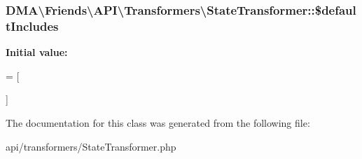 \subsubsection[{\$default\+Includes}]{\setlength{\rightskip}{0pt plus 5cm}D\+M\+A\textbackslash{}\+Friends\textbackslash{}\+A\+P\+I\textbackslash{}\+Transformers\textbackslash{}\+State\+Transformer\+::\$default\+Includes\hspace{0.3cm}{\ttfamily [protected]}}\label{classDMA_1_1Friends_1_1API_1_1Transformers_1_1StateTransformer_a654fafb3a7bde0e6485ad024511d51a9}
{\bfseries Initial value\+:}
\begin{DoxyCode}
= [
            
    ]
\end{DoxyCode}


The documentation for this class was generated from the following file\+:\begin{DoxyCompactItemize}
\item 
api/transformers/State\+Transformer.\+php\end{DoxyCompactItemize}
